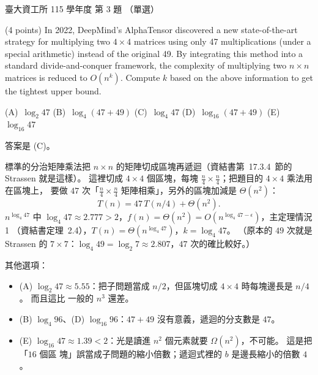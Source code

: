 \begin{pastexam}[label={px:ntu-115-dsa-03}]{臺大資工所 115 學年度 第 3 題}
（單選）

(4 points) In 2022, DeepMind's AlphaTensor discovered a new state-of-the-art strategy for multiplying two $4\times 4$ matrices using only 47 multiplications (under a special arithmetic) instead of the original 49. By integrating this method into a standard divide-and-conquer framework, the complexity of multiplying two $n\times n$ matrices is reduced to $O(n^k)$. Compute $k$ based on the above information to get the tightest upper bound.


(A)~$\log_2 47$ \qquad (B)~$\log_4(47+49)$ \qquad (C)~$\log_4 47$ \qquad (D)~$\log_{16}(47+49)$ \qquad (E)~$\log_{16}47$
\end{pastexam}

\begin{pastsoln}
答案是 (C)。

標準的分治矩陣乘法把 $n \times n$ 的矩陣切成區塊再遞迴（資結書第~17.3.4~節的 Strassen 就是這樣）。
這裡切成 $4 \times 4$ 個區塊，每塊 $\frac{n}{4} \times \frac{n}{4}$；把題目的 $4 \times 4$ 乘法用在區塊上，
要做 $47$ 次「$\frac{n}{4} \times \frac{n}{4}$ 矩陣相乘」，另外的區塊加減是 $\Theta(n^2)$：
\[
T(n) = 47\,T(n/4) + \Theta(n^2).
\]
$n^{\log_4 47}$ 中 $\log_4 47 \approx 2.777 > 2$，$f(n) = \Theta(n^2) = O(n^{\log_4 47 - \epsilon})$，主定理情況 1
（資結書定理~2.4），$T(n) = \Theta(n^{\log_4 47})$，$k = \log_4 47$。 （原本的 $49$ 次就是 Strassen 的
$7 \times 7$：$\log_4 49 = \log_2 7 \approx 2.807$，$47$ 次的確比較好。）

其他選項：
\begin{itemize}
\item (A) $\log_2 47 \approx 5.55$：把子問題當成 $n/2$，但區塊切成 $4 \times 4$ 時每塊邊長是 $n/4$。 而且這比
一般的 $n^3$ 還差。
\item (B) $\log_4 96$、(D) $\log_{16} 96$：$47 + 49$ 沒有意義，遞迴的分支數是 $47$。
\item (E) $\log_{16} 47 \approx 1.39 < 2$：光是讀進 $n^2$ 個元素就要 $\Omega(n^2)$，不可能。 這是把「$16$ 個區
塊」誤當成子問題的縮小倍數；遞迴式裡的 $b$ 是邊長縮小的倍數 $4$。
\end{itemize}
\end{pastsoln}
